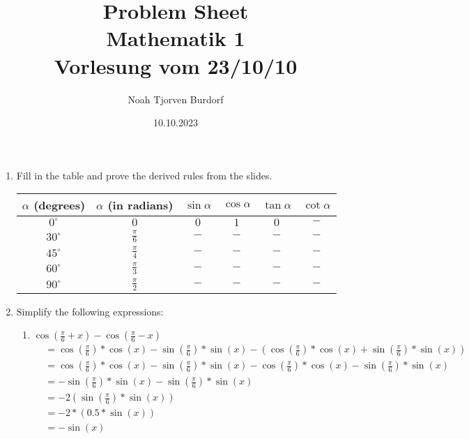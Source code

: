 \documentclass[a4paper,onecolumn,draft,pdftex]{report}
\begin{document}
    \author{Noah Tjorven Burdorf}
    \title{Problem Sheet \\ Mathematik 1 \\ Vorlesung vom 23/10/10}
    \date{10.10.2023}
    \maketitle


    \begin{enumerate}
        \item Fill in the table and prove the derived rules from the slides.
        \begin{table}[h!]
        \begin{tabular}{|c|c|c|c|c|c|}
            $\alpha$ (degrees) & $\alpha$ (in radians) & $\sin \alpha$ & $\cos \alpha$ & $\tan \alpha$ & $\cot \alpha$ \\
            \hline
            $0^\circ$ & $0$ & $0$ & $1$ & $0$ & $-$ \\
            $30^\circ$ & $\frac{\pi}{6}$ & $-$ & $-$ & $-$ & $-$ \\
            $45^\circ$ & $\frac{\pi}{4}$ & $-$ & $-$ & $-$ & $-$ \\
            $60^\circ$ & $\frac{\pi}{3}$ & $-$ & $-$ & $-$ & $-$ \\
            $90^\circ$ & $\frac{\pi}{2}$ & $-$ & $-$ & $-$ & $-$
        \end{tabular}
        \end{table}
        \item Simplify the following expressions:
            \begin{enumerate}
                \item $\cos(\frac{\pi}{6}+x)-\cos(\frac{\pi}{6}-x)$
                \begin{align*}
                    &= \cos(\frac{\pi}{6})*\cos(x)-\sin(\frac{\pi}{6})*\sin(x)-(\cos(\frac{\pi}{6})*\cos(x)+\sin(\frac{\pi}{6})*\sin(x)) \\
                    &= \cos(\frac{\pi}{6})*\cos(x)-\sin(\frac{\pi}{6})*\sin(x)-\cos(\frac{\pi}{6})*\cos(x)-\sin(\frac{\pi}{6})*\sin(x) \\
                    &= -\sin(\frac{\pi}{6})*\sin(x)-\sin(\frac{\pi}{6})*\sin(x) \\
                    &= -2(\sin(\frac{\pi}{6})*\sin(x)) \\
                    &= -2*(0.5*\sin(x)) \\
                    &= -\sin(x)
                \end{align*}

\end{enumerate}
\end{enumerate}
\end{document}
